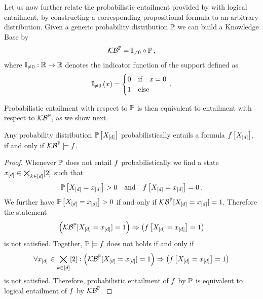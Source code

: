 
Let us now further relate the probabilistic entailment provided by  with logical entailment, by constructing a corresponding propositional formula to an arbitrary distribution.
Given a generic probability distribution $\mathbb{P}$ we can build a Knowledge Base by
\begin{align*}
    \mathcal{KB}^{\mathbb{P}} = \mathbb{I}_{\neq0} \circ \mathbb{P} \, ,
\end{align*}
where $\mathbb{I}_{\neq0}:\mathbb{R}\rightarrow \mathbb{R}$ denotes the indicator function of the support defined as
\begin{align}
    \mathbb{I}_{\neq0}\left(x\right)
    = \begin{cases}
          0 & \text{if}\quad x=0 \\
          1 & \text{else}
    \end{cases} \, .
\end{align}

Probabilistic entailment with respect to $\mathbb{P}$ is then equivalent to entailment with respect to $\mathcal{KB}^{\mathbb{P}}$, as we show next.

\begin{theorem}
    \label{the:entailmentProbToLogical}
    Any probability distribution $\mathbb{P}\left[X_{[d]}\right]$ probabilistically entails a formula $f\left[X_{[d]}\right]$, if and only if $\mathcal{KB}^{\mathbb{P}}\models f$.
\end{theorem}
\begin{proof}
    Whenever $\mathbb{P}$ does not entail $f$ probabilistically we find a state $x_{[d]}\in\bigtimes_{k\in[d]}[2]$ such that
    \begin{align*}
        \mathbb{P}\left[X_{[d]}=x_{[d]}\right] >0 \quad\text{and} \quad f\left[X_{[d]}=x_{[d]}\right] = 0 \, .
    \end{align*}
    We further have $\mathbb{P}\left[X_{[d]}=x_{[d]}\right]>0$ if and only if $\mathcal{KB}^{\mathbb{P}}[X_{[d]}=x_{[d]}]=1$.
    Therefore the statement
    \begin{align*}
        \left(\mathcal{KB}^{\mathbb{P}}[X_{[d]}=x_{[d]}]=1\right)\Rightarrow\left(f\left[X_{[d]}=x_{[d]}\right]=1\right)
    \end{align*}
    is not satisfied.
    Together, $\mathbb{P}\models f$ does not holds if and only if
    \begin{align*}
        \forall{x_{[d]}\in\bigtimes_{k\in[d]}[2]}:{\left(\mathcal{KB}^{\mathbb{P}}[X_{[d]}=x_{[d]}]=1\right)\Rightarrow\left(f\left[X_{[d]}=x_{[d]}\right]=1\right)}
    \end{align*}
    is not satisfied.
    Therefore, probabilistic entailment of $f$ by $\mathbb{P}$ is equivalent to logical entailment of $f$ by $\mathcal{KB}^{\mathbb{P}}$.
\end{proof}

